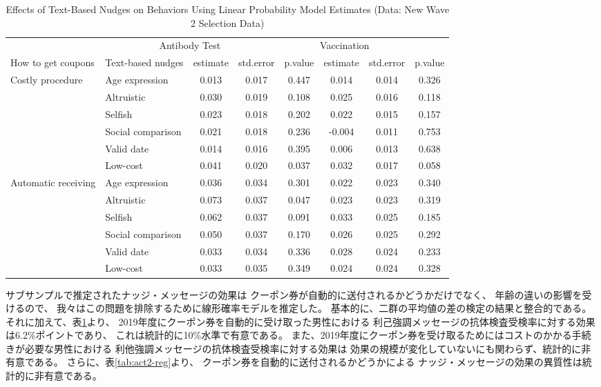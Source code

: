\documentclass[
  11pt,
  a4paper,
]{article}
\begin{document}
\begin{table}

\caption{\label{tab:act2-reg-ftest}Effects of Text-Based Nudges on Behaviors Using Linear Probability Model Estimates (Data: New Wave 2 Selection Data)}
\centering
\begin{tabular}[t]{>{\raggedright\arraybackslash}p{5em}lcccccc}
\toprule
\multicolumn{2}{c}{ } & \multicolumn{3}{c}{Antibody Test} & \multicolumn{3}{c}{Vaccination} \\
\cmidrule(l{3pt}r{3pt}){3-5} \cmidrule(l{3pt}r{3pt}){6-8}
How to get coupons & Text-based nudges & estimate & std.error & p.value & estimate  & std.error  & p.value \\
\midrule
Costly procedure & Age expression & 0.013 & 0.017 & 0.447 & 0.014 & 0.014 & 0.326\\
 & Altruistic & 0.030 & 0.019 & 0.108 & 0.025 & 0.016 & 0.118\\
 & Selfish & 0.023 & 0.018 & 0.202 & 0.022 & 0.015 & 0.157\\
 & Social comparison & 0.021 & 0.018 & 0.236 & -0.004 & 0.011 & 0.753\\
 & Valid date & 0.014 & 0.016 & 0.395 & 0.006 & 0.013 & 0.638\\
 & Low-cost & 0.041 & 0.020 & 0.037 & 0.032 & 0.017 & 0.058\\
Automatic receiving & Age expression & 0.036 & 0.034 & 0.301 & 0.022 & 0.023 & 0.340\\
 & Altruistic & 0.073 & 0.037 & 0.047 & 0.023 & 0.023 & 0.319\\
 & Selfish & 0.062 & 0.037 & 0.091 & 0.033 & 0.025 & 0.185\\
 & Social comparison & 0.050 & 0.037 & 0.170 & 0.026 & 0.025 & 0.292\\
 & Valid date & 0.033 & 0.034 & 0.336 & 0.028 & 0.024 & 0.233\\
 & Low-cost & 0.033 & 0.035 & 0.349 & 0.024 & 0.024 & 0.328\\
\bottomrule
\end{tabular}
\end{table}

サブサンプルで推定されたナッジ・メッセージの効果は
クーポン券が自動的に送付されるかどうかだけでなく、
年齢の違いの影響を受けるので、
我々はこの問題を排除するために線形確率モデルを推定した。
基本的に、二群の平均値の差の検定の結果と整合的である。
それに加えて、表\ref{tab:act2-reg-ftest}より、
2019年度にクーポン券を自動的に受け取った男性における
利己強調メッセージの抗体検査受検率に対する効果は6.2\%ポイントであり、
これは統計的に10\%水準で有意である。
また、2019年度にクーポン券を受け取るためにはコストのかかる手続きが必要な男性における
利他強調メッセージの抗体検査受検率に対する効果は
効果の規模が変化していないにも関わらず、統計的に非有意である。
さらに、表\ref{tab:act2-reg}より、
クーポン券を自動的に送付されるかどうかによる
ナッジ・メッセージの効果の異質性は統計的に非有意である。
\end{document}
